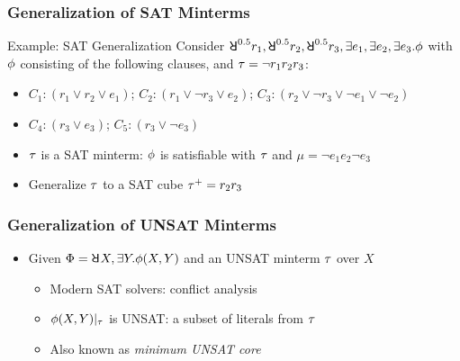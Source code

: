 \begin{frame}
    \frametitle{Generalization of SAT Minterms}
    \begin{block}{Example: SAT Generalization}
        Consider $\random{0.5}r_1,\random{0.5}r_2,\random{0.5}r_3,\exists e_1,\exists e_2,\exists e_3.\pf$ with $\phi$ consisting of the following clauses, and $\tau=\lnot r_1r_2r_3$:
        \begin{itemize}
            \item[] $C_1: (r_1 \lor r_2 \lor e_1)$; $C_2: (r_1 \lor \lnot r_3 \lor e_2)$; $C_3: (r_2 \lor \lnot r_3 \lor \lnot e_1 \lor \lnot e_2)$
            \item[] $C_4: (r_3 \lor e_3)$; $C_5: (r_3 \lor \lnot e_3)$
        \end{itemize}
        \begin{itemize}
            \item $\tau$ is a SAT minterm: $\phi$ is satisfiable with $\tau$ and $\mu=\lnot e_1e_2\lnot e_3$
            \item Generalize $\tau$ to a SAT cube $\tau^+=r_2r_3$
        \end{itemize}
    \end{block}
\end{frame}

\begin{frame}
    \frametitle{Generalization of UNSAT Minterms}
    \begin{itemize}
        \item Given $\Qf=\random{} X,\exists Y.\pf(X,Y)$ and an UNSAT minterm $\tau$ over $X$
              \begin{itemize}
                  \item Modern SAT solvers: conflict analysis
                  \item $\phi(X,Y)|_{\tau}$ is UNSAT: a subset of literals from $\tau$
                  \item Also known as \textit{minimum UNSAT core}
              \end{itemize}
    \end{itemize}
\end{frame}

